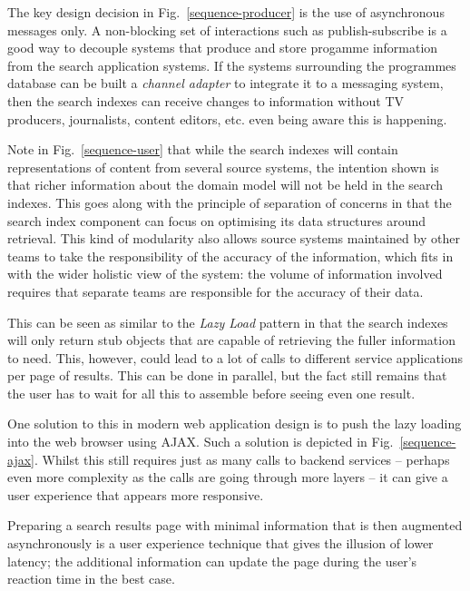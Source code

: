 \documentclass[oribibl]{llncs}
\begin{document}
The key design decision in Fig.~\ref{sequence-producer} is the use of
asynchronous messages only. A non-blocking set of interactions such as
publish-subscribe \citep{hohpe2004enterprise} is a good way to decouple
systems that produce and store progamme information from the search
application systems. If the systems surrounding the programmes database
can be built a \emph{channel adapter} \citep{hohpe2004enterprise} to integrate
it to a messaging system, then the search indexes can receive changes to
information without TV producers, journalists, content
editors, etc. even being aware this is happening.

Note in Fig.~\ref{sequence-user} that while the search indexes
will contain representations of content
from several source systems, the intention shown is that richer information
about the domain model will not be held in the search indexes. This goes
along with the principle of separation of concerns \citep{dijkstra1982role}
in that the search index component can focus on optimising its data
structures around retrieval. This kind of modularity also allows source
systems maintained by other teams to take the responsibility of the
accuracy of the information, which fits in with the wider holistic view
of the system: the volume of information involved requires that
separate teams are responsible for the accuracy of their data.

This can be seen as similar to the \emph{Lazy Load} pattern
\citep{fowler2002patterns} in that the search indexes will only return
stub objects that are capable of retrieving the fuller information
to need. This, however, could lead to a lot of calls to different
service applications per page of results. This can be done in parallel, but
the fact still remains that the user has to wait for all this to
assemble before seeing even one result.

One solution to this in modern web application design is to
push the lazy loading into the web browser using AJAX. \citep{garrett2005ajax}
Such a solution is depicted in Fig.~\ref{sequence-ajax}. Whilst
this still requires just as many calls to backend services --
perhaps even more complexity as the calls are going through
more layers -- it can give a user experience that appears more responsive.

Preparing a search results page with minimal information that is then
augmented asynchronously is a user experience technique that gives the
illusion of lower latency; the additional information can update the page
during the user's reaction time in the best case.
\end{document}

